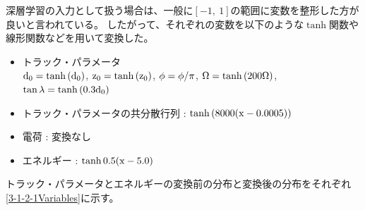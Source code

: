 深層学習の入力として扱う場合は、一般に$[-1,\ 1]$の範囲に変数を整形した方が良いと言われている。
したがって、それぞれの変数を以下のような$\tanh$関数や線形関数などを用いて変換した。

\begin{itemize}
 \item トラック・パラメータ\\
 ${\rm d_0} = \tanh{({\rm d_0})}$,
 ${\rm z_0} = \tanh{({\rm z_0})}$,
 ${\rm \phi} = {\rm \phi}/\pi$,
 ${\rm \Omega} = \tanh{(200{\rm \Omega})}$,
 ${\rm \tan{\lambda}} = \tanh{(0.3{\rm d_0})}$
 \item トラック・パラメータの共分散行列 : $\tanh{(8000({\rm x}-0.0005))}$
 \item 電荷 : 変換なし
 \item エネルギー : $\tanh{0.5({\rm x}-5.0)}$
\end{itemize}

トラック・パラメータとエネルギーの変換前の分布と変換後の分布をそれぞれ\ref{3-1-2-1Variables}に示す。

